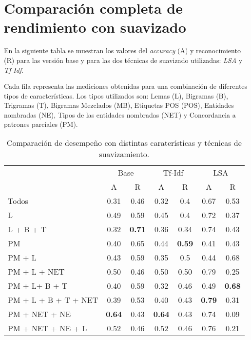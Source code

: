 \chapter{Comparación completa de rendimiento con suavizado}\label{ap-4}

En la siguiente tabla se muestran los valores del \textit{accuracy} (A) y reconocimiento (R) para las versión base y para las dos técnicas de suavizado utilizadas: \textit{LSA} y \textit{Tf-Idf}.

Cada fila representa las mediciones obtenidas para una combinación de diferentes tipos de características. Los tipos utilizados son: Lemas (L), Bigramas (B), Trigramas (T), Bigramas Mezclados (MB), Etiquetas POS (POS), Entidades nombradas (NE), Tipos de las entidades nombradas (NET) y Concordancia a patrones parciales (PM).

\begin{table}[h]
\begin{center}
\begin{tabular}{l c c | c c | c c}
& \multicolumn{2}{c|}{Base} & \multicolumn{2}{c|}{Tf-Idf} & \multicolumn{2}{c}{LSA}\\ [0.5ex]
& A & R & A & R & A & R \\ [0.5ex]
\hline
Todos & 0.31 & 0.46 & 0.32 & 0.4 & 0.67 & 0.53 \\[0.5ex]
L & 0.49 & 0.59 & 0.45 & 0.4 & 0.72 & 0.37 \\[0.5ex]
L + B + T & 0.32 & \textbf{0.71} & 0.36 & 0.34 & 0.74 & 0.43 \\[0.5ex]
PM & 0.40 & 0.65 & 0.44 & \textbf{0.59} & 0.41 & 0.43 \\[0.5ex]
PM + L & 0.43 & 0.59 & 0.35 & 0.5 & 0.44 & 0.68 \\[0.5ex]
PM + L + NET & 0.50 & 0.46 & 0.50 & 0.50 & 0.79 & 0.25\\[0.5ex]
PM + L+ B + T & 0.40 & 0.59 & 0.32 & 0.46 & 0.49 & \textbf{0.68} \\[0.5ex]
PM + L + B + T + NET & 0.39 & 0.53 & 0.40 & 0.43 & \textbf{0.79} & 0.31 \\[0.5ex]
PM + NET + NE & \textbf{0.64} & 0.43 & \textbf{0.64} & 0.43 & 0.74 & 0.09 \\[0.5ex]
PM + NET + NE + L & 0.52 & 0.46 & 0.52 & 0.46 & 0.76 & 0.21 \\[0.5ex]
\hline
\end{tabular}
\end{center}
\caption{Comparación de desempeño con distintas caraterísticas y técnicas de suavizamiento.}\label{t-ap-4}
\end{table}